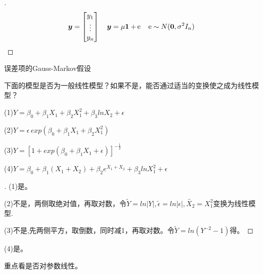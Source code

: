 \documentclass[cn,hazy,green,12pt,normal]{elegantnote}
\DeclareMathOperator{\e}{\!\!\;\mathrm e}
\numberwithin{equation}{section}
\numberwithin{subsection}{section}
\begin{document}
\begin{proof}[\solutionname]
    \[ 
    \bm y= \begin{bmatrix}
        y_1\\
        \vdots\\
        y_n
    \end{bmatrix}\quad
    \bm y=\mu \bm 1 + \bm \e \quad
    \bm \e \sim N(\bm 0, \sigma^2 I_n)
    \]
\end{proof}

\begin{note}
    误差项的Gauss-Markov假设
\end{note}

\begin{homework}
    下面的模型是否为一般线性模型？如果不是，能否通过适当的变换使之成为线性模型？

    (1)$Y=\beta_0+\beta_1X_1+\beta_2X_1^2+\beta_3lnX_2+\epsilon$

    (2)$Y=\epsilon \,exp(\beta_0+\beta_1X_1+\beta_2X_1^2)$

    (3)$Y=[1+exp(\beta_0+\beta_1X_1+\epsilon)]^{-\frac{1}{2}}$

    (4)$Y=\beta_0+\beta_1(X_1+X_2)+\beta_2e^{X_1+X_2}+\beta_3lnX_1^2+\epsilon$
\end{homework}
\begin{proof}[\solutionname]
    (1)是。

    (2)不是，两侧取绝对值，再取对数，令$\tilde{Y}=ln |Y|,\tilde{\epsilon}=ln|\epsilon|,\tilde{X_2}=X_1^2$变换为线性模型.

    (3)不是,先两侧平方，取倒数，同时减1，再取对数。令$\tilde{Y}=ln(Y^{-2}-1)$得。
\end{proof}

(4)是。

\begin{note}
    重点看是否对参数线性。
\end{note}
\end{document}
